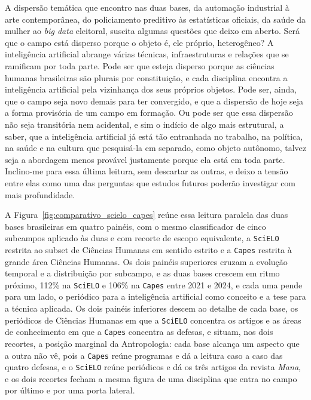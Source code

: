 A dispersão temática que encontro nas duas bases, da automação industrial à arte contemporânea, do policiamento preditivo às estatísticas oficiais, da saúde da mulher ao \emph{big data} eleitoral, suscita algumas questões que deixo em aberto. Será que o campo está disperso porque o objeto é, ele próprio, heterogêneo? A inteligência artificial abrange várias técnicas, infraestruturas e relações que se ramificam por toda parte. Pode ser que esteja disperso porque as ciências humanas brasileiras são plurais por constituição, e cada disciplina encontra a inteligência artificial pela vizinhança dos seus próprios objetos. Pode ser, ainda, que o campo seja novo demais para ter convergido, e que a dispersão de hoje seja a forma provisória de um campo em formação. Ou pode ser que essa dispersão não seja transitória nem acidental, e sim o indício de algo mais estrutural, a saber, que a inteligência artificial já está tão entranhada no trabalho, na política, na saúde e na cultura que pesquisá-la em separado, como objeto autônomo, talvez seja a abordagem menos provável justamente porque ela está em toda parte. Inclino-me para essa última leitura, sem descartar as outras, e deixo a tensão entre elas como uma das perguntas que estudos futuros poderão investigar com mais profundidade.

A Figura~\ref{fig:comparativo_scielo_capes} reúne essa leitura paralela das duas bases brasileiras em quatro painéis, com o mesmo classificador de cinco subcampos aplicado às duas e com recorte de escopo equivalente, a \texttt{SciELO} restrita ao subset de Ciências Humanas em sentido estrito e a \texttt{Capes} restrita à grande área Ciências Humanas. Os dois painéis superiores cruzam a evolução temporal e a distribuição por subcampo, e as duas bases crescem em ritmo próximo, 112\% na \texttt{SciELO} e 106\% na \texttt{Capes} entre 2021 e 2024, e cada uma pende para um lado, o periódico para a inteligência artificial como conceito e a tese para a técnica aplicada. Os dois painéis inferiores descem ao detalhe de cada base, os periódicos de Ciências Humanas em que a \texttt{SciELO} concentra os artigos e as áreas de conhecimento em que a \texttt{Capes} concentra as defesas, e situam, nos dois recortes, a posição marginal da Antropologia: cada base alcança um aspecto que a outra não vê, pois a \texttt{Capes} reúne programas e dá a leitura caso a caso das quatro defesas, e o \texttt{SciELO} reúne periódicos e dá os três artigos da revista \textit{Mana}, e os dois recortes fecham a mesma figura de uma disciplina que entra no campo por último e por uma porta lateral.

